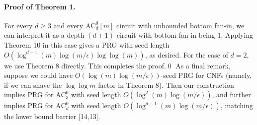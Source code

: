 \paragraph{Proof of Theorem 1.} For every $d\ge3$ and every $\mathrm{AC}^0_d[m]$ circuit with unbounded bottom fan-in, we can interpret it as a depth-$(d+1)$ circuit with bottom fan-in being 1. Applying Theorem 10 in this case gives a PRG with seed length $O(\log^{d-1}(m)\log(m/\epsilon)\log\log(m))$, as desired. For the case of $d=2$, we use Theorem 8 directly. This completes the proof.\qed
As a final remark, suppose we could have $O(\log(m)\log(m/\epsilon))$-seed PRG for CNFs (namely, if we can shave the $\log\log m$ factor in Theorem 8). Then our construction implies PRG for $\mathrm{AC}^0_3$ with seed length $O(\log^2(m)\log(m/\epsilon))$, and further implies PRG for $\mathrm{AC}^0_d$ with seed length $O(\log^{d-1}(m)\log(m/\epsilon))$, matching the lower bound barrier [14,13].

